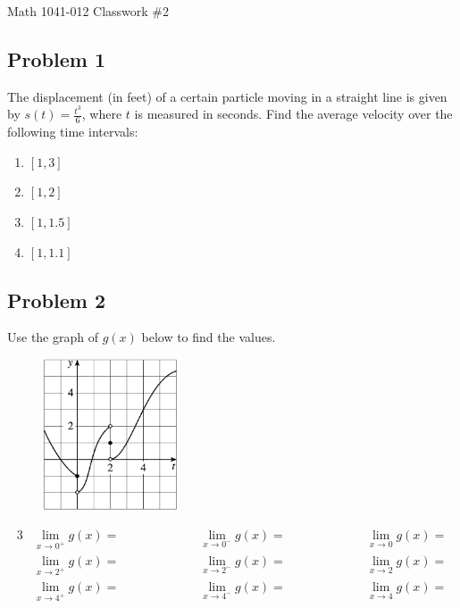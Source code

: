 \documentclass[10pt]{book}
\theoremstyle{definition}
\begin{document}
\begin{center}
{\Large Math 1041-012 \hspace{0.5cm} Classwork \#2}
\end{center}
\vspace{0.2 cm}
\subsection*{Problem 1}The displacement (in feet) of a certain particle moving in a straight line is given by $s(t)=\frac{t^3}{6}$, where $t$ is measured in seconds. Find the average velocity over the following time intervals:
\begin{enumerate}[label=(\alph*)]
    \item $[1,3]$\\[8pt]
    \item $[1,2]$\\[8pt]
    \item $[1,1.5]$\\[8pt]
    \item $[1,1.1]$
\end{enumerate}
\subsection*{Problem 2}
Use the graph of $g(x)$ below to find the values.
\begin{figure}[h]
\centering
\includegraphics[width=4cm]{piecewise1.png}
\end{figure}
\begin{alignat*}{3}
&\lim_{x\rightarrow 0^+}g(x)=\hspace{2cm} &&  \lim_{x\rightarrow 0^-}g(x)=\hspace{2cm} && \lim_{x\rightarrow 0}g(x)=\\[8pt]
&\lim_{x\rightarrow 2^+}g(x)=\hspace{2cm} &&  \lim_{x\rightarrow 2^-}g(x)=\hspace{2cm} && \lim_{x\rightarrow 2}g(x)=\\[8pt]
&\lim_{x\rightarrow 4^+}g(x)=\hspace{2cm} &&  \lim_{x\rightarrow 4^-}g(x)=\hspace{2cm} && \lim_{x\rightarrow 4}g(x)=
\end{alignat*}
\end{document}
